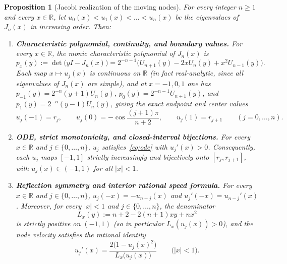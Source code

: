\documentclass[11pt,a4paper]{article}
\newcommand{\R}{\mathbb{R}}
\newtheorem{proposition}{Proposition}[section]
\theoremstyle{remark}
\numberwithin{equation}{section}
\begin{document}
\begin{proposition}[Jacobi realization of the moving nodes]
    \label{prop:jacobi}
    For every integer $n \ge 1$ and every $x \in \R$, let $u_0(x) < u_1(x) < \dots < u_n(x)$ be the eigenvalues of $J_n(x)$ in increasing order. Then:
    \begin{enumerate}[label=\textup{(\roman*)}]
        \item \textbf{Characteristic polynomial, continuity, and boundary values.}
        For every $x \in \R$, the monic characteristic polynomial of $J_n(x)$ is
        \begin{equation}
            p_x(y) := \det\bigl(yI - J_n(x)\bigr)
            = 2^{-n-1}\bigl(U_{n+1}(y) - 2xU_n(y) + x^2 U_{n-1}(y)\bigr).
            \label{eq:charpoly}
        \end{equation}
        Each map $x \mapsto u_j(x)$ is continuous on $\R$ (in fact real-analytic, since all eigenvalues of $J_n(x)$ are simple), and at $x = -1, 0, 1$ one has $p_{-1}(y) = 2^{-n}(y+1)U_n(y)$, $p_0(y) = 2^{-n-1}U_{n+1}(y)$, and $p_1(y) = 2^{-n}(y-1)U_n(y)$, giving the exact endpoint and center values
        \[
            u_j(-1) = r_j,
            \qquad
            u_j(0) = -\cos\frac{(j+1)\pi}{n+2},
            \qquad
            u_j(1) = r_{j+1}
            \qquad (j = 0, \dots, n).
        \]
        \item \textbf{ODE, strict monotonicity, and closed-interval bijections.}
        For every $x \in \R$ and $j \in \{0, \dots, n\}$, $u_j$ satisfies~\eqref{eq:ode} with $u_j'(x) > 0$. Consequently, each $u_j$ maps $[-1,1]$ strictly increasingly and bijectively onto $[r_j, r_{j+1}]$, with $u_j(x) \in (-1,1)$ for all $|x| < 1$.
        \item \textbf{Reflection symmetry and interior rational speed formula.}
        For every $x \in \R$ and $j \in \{0, \dots, n\}$, $u_j(-x) = -u_{n-j}(x)$ and $u_j'(-x) = u_{n-j}'(x)$. Moreover, for every $|x| < 1$ and $j \in \{0, \dots, n\}$, the denominator
        \[
            L_x(y) := n + 2 - 2(n+1)xy + nx^2
        \]
        is strictly positive on $(-1,1)$ (so in particular $L_x(u_j(x)) > 0$), and the node velocity satisfies the rational identity
        \begin{equation}
            u_j'(x) = \frac{2\bigl(1 - u_j(x)^2\bigr)}{L_x\bigl(u_j(x)\bigr)}
            \qquad \bigl(|x| < 1\bigr).
            \label{eq:speed}
        \end{equation}
    \end{enumerate}
\end{proposition}
\end{document}
